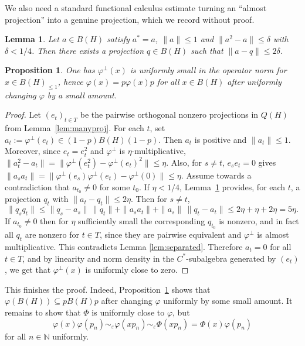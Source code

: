 \documentclass[11pt]{amsproc}
\newcommand{\BH}{B(H)}
\newcommand{\QH}{Q(H)}
\theoremstyle{definition}
\theoremstyle{plain}
\newtheorem{lemma}[definition]{Lemma}
\newtheorem{proposition}[definition]{Proposition}
\theoremstyle{remark}
\begin{document}
We also need a standard functional calculus estimate turning an ``almost projection'' into a genuine projection, which we record without proof.

\begin{lemma}\label{lem:almostproj}
Let $a\in\BH$ satisfy $a^*=a$, $\|a\|\le 1$ and $\|a^2-a\|\le \delta$ with $\delta<1/4$.
Then there exists a projection $q\in\BH$ such that $\|a-q\|\le 2\delta$.
\end{lemma}

\begin{proposition}\label{prop:calkin_kill}
One has $\varphi^\perp(x)$ is uniformly small in the operator norm for $x \in B(H)_{\le 1}$, hence
$\varphi(x)=p\varphi(x)p$ for all $x\in\BH$ after uniformly changing $\varphi$ by a  small amount.
\end{proposition}

\begin{proof}
Let $(e_t)_{t\in T}$ be the pairwise orthogonal nonzero projections in $\QH$ from Lemma~\ref{lem:manyproj}.
For each $t$, set $a_t:=\varphi^{\perp}(e_t)\in (1-p)\BH(1-p)$.
Then $a_t$ is positive and $\|a_t\|\le 1$.
Moreover, since $e_t=e_t^2$ and $\varphi^{\perp}$ is $\eta$-multiplicative,
$\|a_t^2-a_t\|=\|\varphi^{\perp}(e_t^2)-\varphi^{\perp}(e_t)^2\|\le \eta.
$
Also, for $s\ne t$, $e_s e_t=0$ gives
$\|a_s a_t\| = \|\varphi^{\perp}(e_s)\varphi^{\perp}(e_t)-\varphi^{\perp}(0)\|\le \eta.
$
Assume towards a contradiction that $a_{t_0}\ne 0$ for some $t_0$.
If $\eta<1/4$, Lemma~\ref{lem:almostproj} provides, for each $t$, a projection $q_t$ with
$\|a_t-q_t\|\le 2\eta.
$
Then for $s\ne t$,
\[
\|q_s q_t\|\le \|q_s-a_s\|\,\|q_t\| + \|a_s a_t\| + \|a_s\|\,\|q_t-a_t\|
\le 2\eta + \eta + 2\eta = 5\eta.
\]
If $a_{t_0}\ne 0$ then for $\eta$ sufficiently small the corresponding $q_{t_0}$ is nonzero, and in fact all $q_t$ are nonzero for $t \in T$, since they are pairwise equivalent and $\varphi^{\perp}$ is almost multiplicative. This contradicts  Lemma \ref{lem:separated}. Therefore $a_t=0$ for all $t\in T$, and by linearity and norm density in the $C^*$-subalgebra generated by $(e_t)$, we get that $\varphi^{\perp}(x)$ is uniformly close to zero.
\end{proof}

This finishes the proof. Indeed, Proposition~\ref{prop:calkin_kill} shows that $\varphi(\BH)\subseteq p\BH p$ after changing $\varphi$ uniformly by some small amount.
It remains to show that $\Phi$ is uniformly close to $\varphi$, but 
$$\varphi(x) \varphi(p_n) \sim_{\varepsilon} \varphi(xp_n) \sim_{\varepsilon} \Phi(xp_n) = \Phi(x) \varphi(p_n)$$ for all $n \in \mathbb N$ uniformly.
\end{document}
